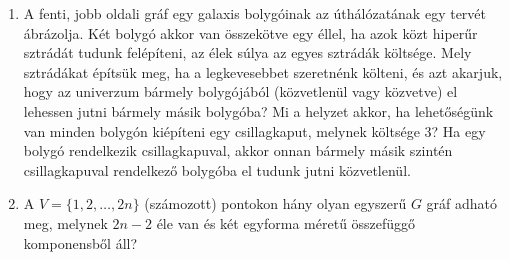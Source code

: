 \documentclass[a4paper,12pt]{article}
\begin{document}
\begin{enumerate}
        \begin{figure}[h]
            \centering
            \begin{subfigure}{0.45\textwidth}
                \centering
                 \hspace{1in}
            \end{subfigure}
            \begin{subfigure}{0.45\textwidth}
                \centering
                
            \end{subfigure}
        \end{figure}
        
        \item A fenti, jobb oldali gráf egy galaxis bolygóinak az úthálózatának egy tervét ábrázolja. Két bolygó akkor van összekötve egy éllel, ha azok közt hiperűr sztrádát tudunk felépíteni, az élek súlya az egyes sztrádák költsége. Mely sztrádákat építsük meg, ha a legkevesebbet szeretnénk költeni, és azt akarjuk, hogy az univerzum bármely bolygójából (közvetlenül vagy közvetve) el lehessen jutni bármely másik bolygóba? Mi a helyzet akkor, ha lehetőségünk van minden bolygón kiépíteni egy csillagkaput, melynek költsége $3$? Ha egy bolygó rendelkezik csillagkapuval, akkor onnan bármely másik szintén csillagkapuval rendelkező bolygóba el tudunk jutni közvetlenül.
        
        

        \item A $V=\{1,2, \ldots, 2n \}$ (számozott) pontokon hány olyan egyszerű $G$ gráf adható meg, melynek $2n-2$ éle van és két egyforma méretű összefüggő komponensből áll?
    \end{enumerate}
\end{document}
